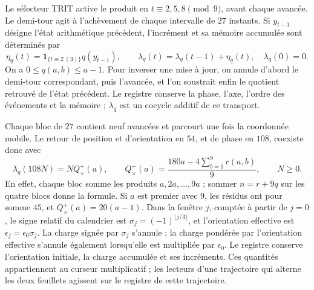 Le sélecteur TRIT active le produit en \(t\equiv2,5,8\pmod9\),
avant chaque avancée. Le demi-tour agit à l'achèvement de chaque
intervalle de \(27\) instants. Si \(y_{t-1}\) désigne l'état arithmétique
précédent, l'incrément et sa mémoire accumulée sont déterminés par
\begin{equation}
 \eta_q(t)=\mathbf1_{\{t\equiv2\ (3)\}}q(y_{t-1}),\qquad
 \lambda_q(t)=\lambda_q(t-1)+\eta_q(t),\quad \lambda_q(0)=0.
 \label{prd-arit:incremento}
\end{equation}
On a \(0\leq q(a,b)\leq a-1\). Pour inverser une
mise à jour, on annule d'abord le demi-tour correspondant,
puis l'avancée, et l'on soustrait enfin le quotient retrouvé de
l'état précédent. Le registre conserve la phase, l'axe, l'ordre des événements et
la mémoire ; \(\lambda_q\) est un cocycle additif de ce transport.

Chaque bloc de \(27\) contient neuf avancées et parcourt une fois
la coordonnée mobile. Le retour de position et d'orientation
en \(54\), et de phase en \(108\), coexiste donc avec
\begin{equation}
 \lambda_q(108N)=NQ_\times^+(a),\qquad
 Q_\times^+(a)=\frac{180a-4\sum_{b=1}^9r(a,b)}9,
 \qquad N\geq0.
 \label{prd-arit:retorno}
\end{equation}
En effet, chaque bloc somme les produits \(a,2a,\ldots,9a\) ;
sommer \(n=r+9q\) sur les quatre blocs donne la formule. Si
\(a\) est premier avec \(9\), les résidus ont pour somme \(45\), et
\(Q_\times^+(a)=20(a-1)\). Dans la fenêtre \(j\), comptée à partir de
\(j=0\), le signe relatif du calendrier est
\(\sigma_j=(-1)^{\lfloor j/3\rfloor}\), et l'orientation
effective est \(\epsilon_j=\epsilon_0\sigma_j\).
La charge signée par \(\sigma_j\) s'annule ; la charge pondérée
par l'orientation effective s'annule également lorsqu'elle est multipliée par
\(\epsilon_0\). Le registre conserve l'orientation initiale, la charge
accumulée et ses incréments. Ces quantités appartiennent
au curseur multiplicatif ; les lecteurs d'une trajectoire qui
alterne les deux feuillets agissent sur le registre de cette trajectoire.
